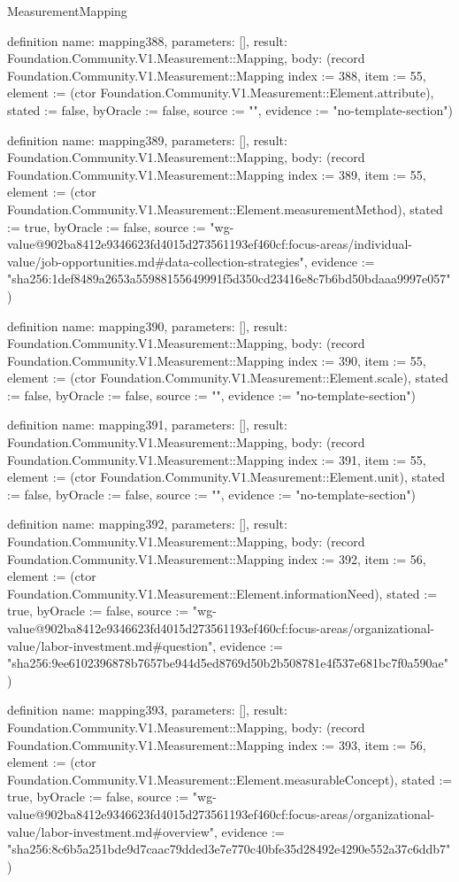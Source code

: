 \begin{lexlean}{MeasurementMapping}
\begin{semanticmodule}
definition{
  name: mapping388,
  parameters: [],
  result: Foundation.Community.V1.Measurement::Mapping,
  body: (record Foundation.Community.V1.Measurement::Mapping {index := 388, item := 55, element := (ctor Foundation.Community.V1.Measurement::Element.attribute), stated := false, byOracle := false, source := "", evidence := "no-template-section"})
}

definition{
  name: mapping389,
  parameters: [],
  result: Foundation.Community.V1.Measurement::Mapping,
  body: (record Foundation.Community.V1.Measurement::Mapping {index := 389, item := 55, element := (ctor Foundation.Community.V1.Measurement::Element.measurementMethod), stated := true, byOracle := false, source := "wg-value@902ba8412e9346623fd4015d273561193ef460cf:focus-areas/individual-value/job-opportunities.md#data-collection-strategies", evidence := "sha256:1def8489a2653a55988155649991f5d350cd23416e8c7b6bd50bdaaa9997e057"})
}

definition{
  name: mapping390,
  parameters: [],
  result: Foundation.Community.V1.Measurement::Mapping,
  body: (record Foundation.Community.V1.Measurement::Mapping {index := 390, item := 55, element := (ctor Foundation.Community.V1.Measurement::Element.scale), stated := false, byOracle := false, source := "", evidence := "no-template-section"})
}

definition{
  name: mapping391,
  parameters: [],
  result: Foundation.Community.V1.Measurement::Mapping,
  body: (record Foundation.Community.V1.Measurement::Mapping {index := 391, item := 55, element := (ctor Foundation.Community.V1.Measurement::Element.unit), stated := false, byOracle := false, source := "", evidence := "no-template-section"})
}

definition{
  name: mapping392,
  parameters: [],
  result: Foundation.Community.V1.Measurement::Mapping,
  body: (record Foundation.Community.V1.Measurement::Mapping {index := 392, item := 56, element := (ctor Foundation.Community.V1.Measurement::Element.informationNeed), stated := true, byOracle := false, source := "wg-value@902ba8412e9346623fd4015d273561193ef460cf:focus-areas/organizational-value/labor-investment.md#question", evidence := "sha256:9ee6102396878b7657be944d5ed8769d50b2b508781e4f537e681bc7f0a590ae"})
}

definition{
  name: mapping393,
  parameters: [],
  result: Foundation.Community.V1.Measurement::Mapping,
  body: (record Foundation.Community.V1.Measurement::Mapping {index := 393, item := 56, element := (ctor Foundation.Community.V1.Measurement::Element.measurableConcept), stated := true, byOracle := false, source := "wg-value@902ba8412e9346623fd4015d273561193ef460cf:focus-areas/organizational-value/labor-investment.md#overview", evidence := "sha256:8c6b5a251bde9d7caac79dded3e7e770c40bfe35d28492e4290e552a37c6ddb7"})
}


\end{semanticmodule}
\end{lexlean}
